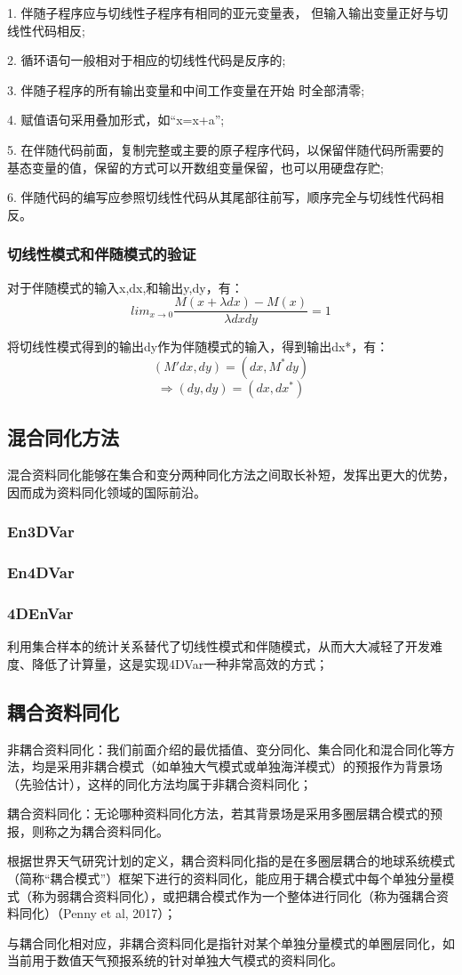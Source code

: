 \documentclass{article}
\begin{document}
1. 伴随子程序应与切线性子程序有相同的亚元变量表，
但输入输出变量正好与切线性代码相反;

2. 循环语句一般相对于相应的切线性代码是反序的;

3. 伴随子程序的所有输出变量和中间工作变量在开始
时全部清零;

4. 赋值语句采用叠加形式，如“x=x+a”;

5. 在伴随代码前面，复制完整或主要的原子程序代码，以保留伴随代码所需要的基态变量的值，保留的方式可以开数组变量保留，也可以用硬盘存贮;

6. 伴随代码的编写应参照切线性代码从其尾部往前写，顺序完全与切线性代码相反。

\subsubsection{切线性模式和伴随模式的验证}
对于伴随模式的输入x,dx,和输出y,dy，有：
$$lim_{x\to0}\frac{M(x+\lambda dx)-M(x)}{\lambda dxdy} = 1$$

将切线性模式得到的输出dy作为伴随模式的输入，得到输出dx*，有：
$$(M'dx, dy) = (dx, M^*dy)$$
$$\Rightarrow (dy, dy) = (dx, dx^{*})$$


\subsection{混合同化方法}
混合资料同化能够在集合和变分两种同化方法之间取长补短，发挥出更大的优势，因而成为资料同化领域的国际前沿。

\subsubsection{En3DVar}
\subsubsection{En4DVar}
\subsubsection{4DEnVar}
利用集合样本的统计关系替代了切线性模式和伴随模式，从而大大减轻了开发难度、降低了计算量，这是实现4DVar一种非常高效的方式；

\subsection{耦合资料同化}
非耦合资料同化：我们前面介绍的最优插值、变分同化、集合同化和混合同化等方法，均是采用非耦合模式（如单独大气模式或单独海洋模式）的预报作为背景场（先验估计），这样的同化方法均属于非耦合资料同化；

耦合资料同化：无论哪种资料同化方法，若其背景场是采用多圈层耦合模式的预报，则称之为耦合资料同化。

根据世界天气研究计划的定义，耦合资料同化指的是在多圈层耦合的地球系统模式（简称“耦合模式”）框架下进行的资料同化，能应用于耦合模式中每个单独分量模式（称为弱耦合资料同化），或把耦合模式作为一个整体进行同化（称为强耦合资料同化）（Penny et al, 2017）；

与耦合同化相对应，非耦合资料同化是指针对某个单独分量模式的单圈层同化，如当前用于数值天气预报系统的针对单独大气模式的资料同化。
\end{document}
